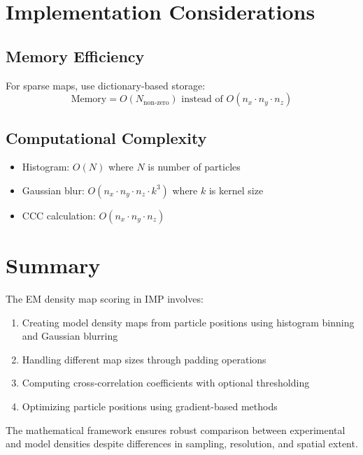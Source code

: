 \documentclass[12pt,a4paper]{article}
\begin{document}
\section{Implementation Considerations}

\subsection{Memory Efficiency}
For sparse maps, use dictionary-based storage:
\begin{equation}
\text{Memory} = O(N_{\text{non-zero}}) \text{ instead of } O(n_x \cdot n_y \cdot n_z)
\end{equation}

\subsection{Computational Complexity}
\begin{itemize}
    \item Histogram: $O(N)$ where $N$ is number of particles
    \item Gaussian blur: $O(n_x \cdot n_y \cdot n_z \cdot k^3)$ where $k$ is kernel size
    \item CCC calculation: $O(n_x \cdot n_y \cdot n_z)$
\end{itemize}

\section{Summary}
The EM density map scoring in IMP involves:
\begin{enumerate}
    \item Creating model density maps from particle positions using histogram binning and Gaussian blurring
    \item Handling different map sizes through padding operations
    \item Computing cross-correlation coefficients with optional thresholding
    \item Optimizing particle positions using gradient-based methods
\end{enumerate}

The mathematical framework ensures robust comparison between experimental and model densities despite differences in sampling, resolution, and spatial extent.
\end{document}
